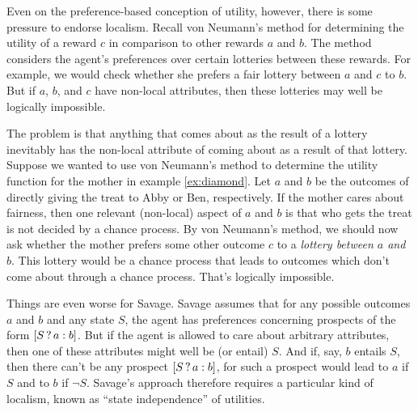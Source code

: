 

Even on the preference-based conception of utility, however, there is
some pressure to endorse localism. Recall von Neumann's method for
determining the utility of a reward $c$ in comparison to other rewards
$a$ and $b$. The method considers the agent's preferences over certain
lotteries between these rewards. For example, we would check whether
she prefers a fair lottery between $a$ and $c$ to $b$. But if $a$,
$b$, and $c$ have non-local attributes, then these lotteries may well
be logically impossible.

The problem is that anything that comes about as the result of a
lottery inevitably has the non-local attribute of coming about as a
result of that lottery. Suppose we wanted to use von Neumann's method
to determine the utility function for the mother in example
\ref{ex:diamond}. Let $a$ and $b$ be the outcomes of directly giving
the treat to Abby or Ben, respectively. If the mother cares about
fairness, then one relevant (non-local) aspect of $a$ and $b$ is that
who gets the treat is not decided by a chance process. By von
Neumann's method, we should now ask whether the mother prefers some
other outcome $c$ to a \emph{lottery between $a$ and $b$}. This
lottery would be a chance process that leads to outcomes which don't
come about through a chance process. That's logically impossible.

Things are even worse for Savage. Savage assumes that for any possible
outcomes $a$ and $b$ and any state $S$, the agent has preferences
concerning prospects of the form $[S\,?\, a :b]$. But if the agent is
allowed to care about arbitrary attributes, then one of these
attributes might well be (or entail) $S$. And if, say, $b$ entails
$S$, then there can't be any prospect $[S\,?\, a :b]$, for such a
prospect would lead to $a$ if $S$ and to $b$ if $\neg S$. Savage's
approach therefore requires a particular kind of localism, known as
``state independence'' of utilities.


